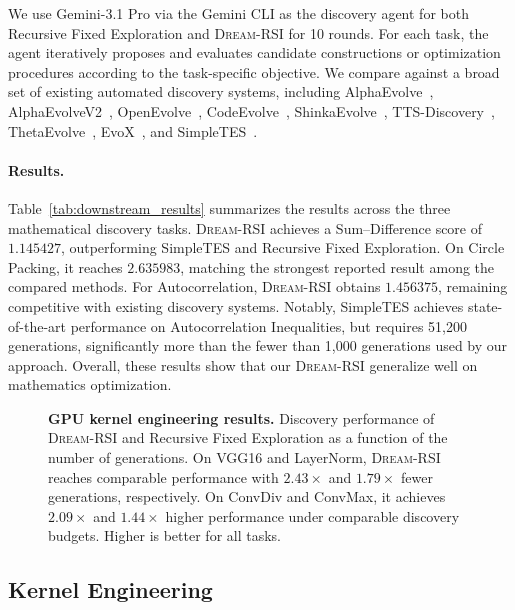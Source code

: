 We use Gemini-3.1 Pro via the Gemini CLI as the discovery agent for both Recursive Fixed Exploration and \textsc{Dream-RSI} for 10 rounds. For each task, the agent iteratively proposes and evaluates candidate constructions or optimization procedures according to the task-specific objective. We compare against a broad set of existing automated discovery systems, including AlphaEvolve~\citep{novikov2025alphaevolve}, AlphaEvolveV2~\citep{georgiev2025mathematical}, OpenEvolve~\citep{openevolve}, CodeEvolve~\citep{assumpccao2025codeevolve}, ShinkaEvolve~\citep{lange2026shinkaevolve}, TTS-Discovery~\citep{yuksekgonul2026learning}, ThetaEvolve~\citep{wang2025thetaevolve}, EvoX~\citep{liu2026evox}, and SimpleTES~\citep{ye2026evaluation}.

\paragraph{Results.}
Table~\ref{tab:downstream_results} summarizes the results across the three mathematical discovery tasks.
\textsc{Dream-RSI} achieves a Sum--Difference score of $1.145427$, outperforming SimpleTES and Recursive Fixed Exploration.
On Circle Packing, it reaches $2.635983$, matching the strongest reported result among the compared methods.
For Autocorrelation, \textsc{Dream-RSI} obtains $1.456375$, remaining competitive with existing discovery systems. Notably, SimpleTES achieves state-of-the-art performance on Autocorrelation Inequalities, but requires 51,200 generations, significantly more than the fewer than 1,000 generations used by our approach.
Overall, these results show that our \textsc{Dream-RSI} generalize well on mathematics optimization.



\begin{figure}[t]
    \centering
    
    \caption{
\textbf{GPU kernel engineering results.}
Discovery performance of \textsc{Dream-RSI} and Recursive Fixed Exploration as a function of the number of generations.
On VGG16 and LayerNorm, \textsc{Dream-RSI} reaches comparable performance with $2.43\times$ and $1.79\times$ fewer generations, respectively.
On ConvDiv and ConvMax, it achieves $2.09\times$ and $1.44\times$ higher performance under comparable discovery budgets.
Higher is better for all tasks.
}
    \label{fig:kernelbench-scaling}
\end{figure}
\subsection{Kernel Engineering}

